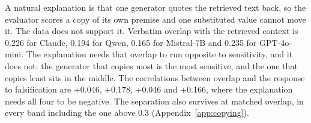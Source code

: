 \label{sec:copying}

A natural explanation is that one generator quotes the retrieved text back, so the evaluator scores a copy of its own premise and one substituted value cannot move it. The data does not support it. Verbatim overlap with the retrieved context is 0.226 for Claude, 0.194 for Qwen, 0.165 for Mistral-7B and 0.235 for GPT-4o-mini. The explanation needs that overlap to run opposite to sensitivity, and it does not: the generator that copies most is the most sensitive, and the one that copies least sits in the middle. The correlations between overlap and the response to falsification are +0.046, +0.178, +0.046 and +0.166, where the explanation needs all four to be negative. The separation also survives at matched overlap, in every band including the one above 0.3 (Appendix~\ref{app:copying}).
